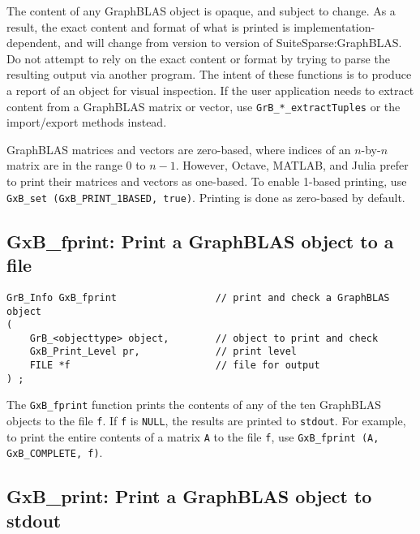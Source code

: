 \documentclass[12pt]{article}
\begin{document}
The content of any GraphBLAS object is opaque, and subject to change.  As a
result, the exact content and format of what is printed is
implementation-dependent, and will change from version to version of
SuiteSparse:GraphBLAS.  Do not attempt to rely on the exact content or format
by trying to parse the resulting output via another program.  The intent of
these functions is to produce a report of an object for visual inspection.  If
the user application needs to extract content from a GraphBLAS matrix or
vector, use \verb'GrB_*_extractTuples' or the import/export methods instead.

GraphBLAS matrices and vectors are zero-based, where indices of an $n$-by-$n$
matrix are in the range 0 to $n-1$.  However, Octave, MATLAB, and Julia prefer
to print their matrices and vectors as one-based.  To enable 1-based printing,
use \verb'GxB_set (GxB_PRINT_1BASED, true)'.  Printing is done as zero-based by
default.

\newpage
\subsection{{\sf GxB\_fprint:} Print a GraphBLAS object to a file} %

\begin{mdframed}[userdefinedwidth=6in]
{\footnotesize
\begin{verbatim}
GrB_Info GxB_fprint                 // print and check a GraphBLAS object
(
    GrB_<objecttype> object,        // object to print and check
    GxB_Print_Level pr,             // print level
    FILE *f                         // file for output
) ;
\end{verbatim} } \end{mdframed}

The \verb'GxB_fprint' function prints the contents of any of the ten GraphBLAS
objects to the file \verb'f'.  If \verb'f' is \verb'NULL', the results are
printed to \verb'stdout'.  For example, to print the entire contents of a
matrix \verb'A' to the file \verb'f', use
\verb'GxB_fprint (A, GxB_COMPLETE, f)'.

\subsection{{\sf GxB\_print:} Print a GraphBLAS object to {\sf stdout}} %
\label{gxb_print}
\end{document}
